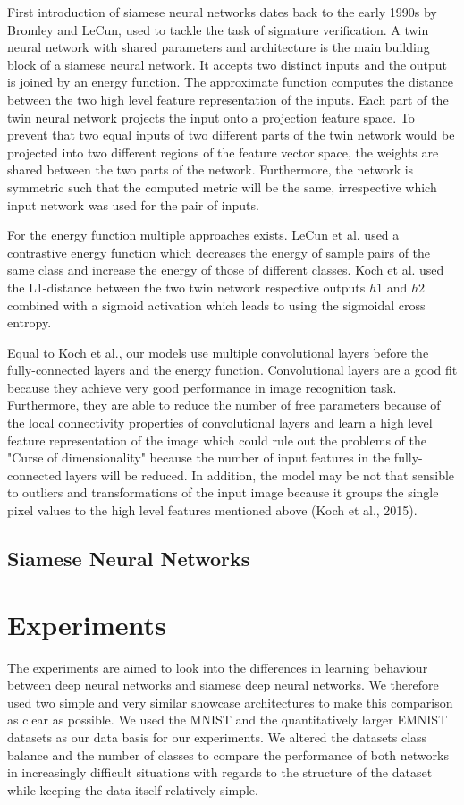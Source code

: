 ﻿\documentclass[a4paper,pt12]{article}
\begin{document}
First introduction of siamese neural networks dates back to the early 1990s by Bromley and LeCun, used to tackle the task of signature verification. A twin neural network with shared parameters and architecture is the main building block of a siamese neural network. It accepts two distinct inputs and the output is joined by an energy function. The approximate function computes the distance between the two high level feature representation of the inputs. Each part of the twin neural network projects the input onto a projection feature space. To prevent that two equal inputs of two different parts of the twin network would be projected into two different regions of the feature vector space, the weights are shared between the two parts of the network. Furthermore, the network is symmetric such that the computed metric will be the same, irrespective which input network was used for the pair of inputs.

For the energy function multiple approaches exists. LeCun et al. used a contrastive energy function which decreases the energy of sample pairs of the same class and increase the energy of those of different classes. Koch et al. used the L1-distance between the two twin network respective outputs $h1$ and $h2$ combined with a sigmoid activation which leads to using the sigmoidal cross entropy.

Equal to Koch et al., our models use multiple convolutional layers before the fully-connected layers and the energy function. Convolutional layers are a good fit because they achieve very good performance in image recognition task. Furthermore, they are able to reduce the number of free parameters because of the local connectivity properties of convolutional layers and learn a high level feature representation of the image which could rule out the problems of the "Curse of dimensionality" because the number of input features in the fully-connected layers will be reduced. In addition, the model may be not that sensible to outliers and transformations of the input image because it groups the single pixel values to the high level features mentioned above (Koch et al., 2015).

\subsection{Siamese Neural Networks}

\section{Experiments}
The experiments are aimed to look into the differences in learning behaviour between deep neural networks and siamese deep neural networks. We therefore used two simple and very similar showcase architectures to make this comparison as clear as possible. We used the MNIST and the quantitatively larger EMNIST datasets as our data basis for our experiments. We altered the datasets class balance and the number of classes to compare the performance of both networks in increasingly difficult situations with regards to the structure of the dataset while keeping the data itself relatively simple.  
\end{document}
